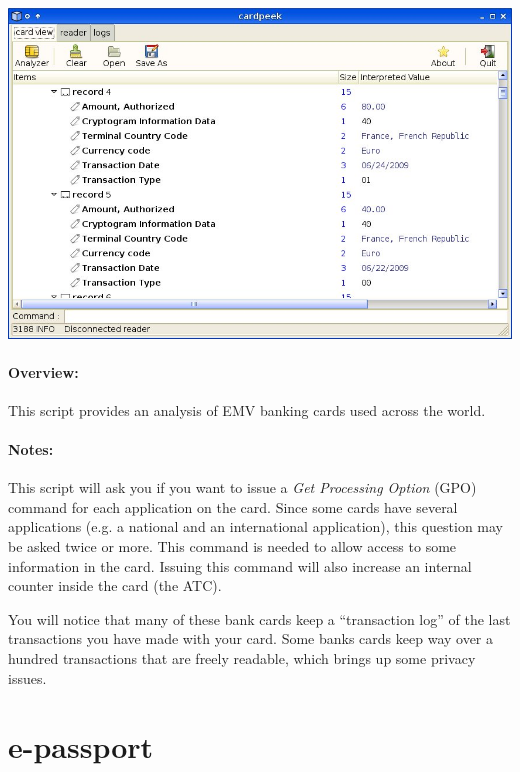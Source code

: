 \documentclass[11pt]{report}
\begin{document}
\begin{center}
\includegraphics[width=1\textwidth]{graphics/sample-emv.jpg}
\end{center}

\paragraph{Overview:}
This script provides an analysis of EMV banking cards used across the world.

\paragraph{Notes:}
This script will ask you if you want to issue a \emph{Get Processing Option} (GPO) command for each application on the card.
Since some cards have several applications (e.g. a national and an international application), this question may be asked twice or more.
This command is needed to allow access to some information in the card.
Issuing this command will also increase an internal counter inside the card (the ATC). 

You will notice that many of these bank cards keep a ``transaction log'' of the last transactions you have made with your card.
Some banks cards keep way over a hundred transactions that are freely readable, which brings up some privacy issues.

\section{e-passport}
\end{document}

